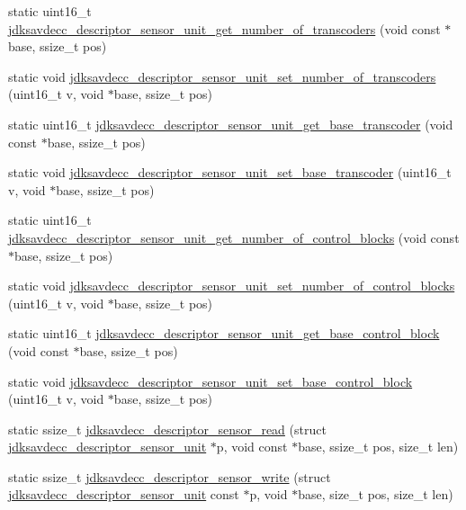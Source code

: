 \begin{DoxyCompactItemize}
\item 
static uint16\+\_\+t \hyperlink{group__descriptor__sensor_gaefa2ca197d1fd3788d54c0ecee03dacd}{jdksavdecc\+\_\+descriptor\+\_\+sensor\+\_\+unit\+\_\+get\+\_\+number\+\_\+of\+\_\+transcoders} (void const $\ast$base, ssize\+\_\+t pos)
\item 
static void \hyperlink{group__descriptor__sensor_gae95fc5d48fb2b22a20cf991b9546a975}{jdksavdecc\+\_\+descriptor\+\_\+sensor\+\_\+unit\+\_\+set\+\_\+number\+\_\+of\+\_\+transcoders} (uint16\+\_\+t v, void $\ast$base, ssize\+\_\+t pos)
\item 
static uint16\+\_\+t \hyperlink{group__descriptor__sensor_ga0453b7a4171ca82f60c1c98015baa634}{jdksavdecc\+\_\+descriptor\+\_\+sensor\+\_\+unit\+\_\+get\+\_\+base\+\_\+transcoder} (void const $\ast$base, ssize\+\_\+t pos)
\item 
static void \hyperlink{group__descriptor__sensor_ga2ffdc6d6d6964e16f6d3f529f51771e8}{jdksavdecc\+\_\+descriptor\+\_\+sensor\+\_\+unit\+\_\+set\+\_\+base\+\_\+transcoder} (uint16\+\_\+t v, void $\ast$base, ssize\+\_\+t pos)
\item 
static uint16\+\_\+t \hyperlink{group__descriptor__sensor_ga95f619830af7cfb75fd5cb65ed4fb26c}{jdksavdecc\+\_\+descriptor\+\_\+sensor\+\_\+unit\+\_\+get\+\_\+number\+\_\+of\+\_\+control\+\_\+blocks} (void const $\ast$base, ssize\+\_\+t pos)
\item 
static void \hyperlink{group__descriptor__sensor_ga51eaf09acad54c56388065f5e3da6417}{jdksavdecc\+\_\+descriptor\+\_\+sensor\+\_\+unit\+\_\+set\+\_\+number\+\_\+of\+\_\+control\+\_\+blocks} (uint16\+\_\+t v, void $\ast$base, ssize\+\_\+t pos)
\item 
static uint16\+\_\+t \hyperlink{group__descriptor__sensor_ga27d66aa606dcaee923ef9400ec6f3221}{jdksavdecc\+\_\+descriptor\+\_\+sensor\+\_\+unit\+\_\+get\+\_\+base\+\_\+control\+\_\+block} (void const $\ast$base, ssize\+\_\+t pos)
\item 
static void \hyperlink{group__descriptor__sensor_gaf6e357e564a8d89324eba56d82886fd1}{jdksavdecc\+\_\+descriptor\+\_\+sensor\+\_\+unit\+\_\+set\+\_\+base\+\_\+control\+\_\+block} (uint16\+\_\+t v, void $\ast$base, ssize\+\_\+t pos)
\item 
static ssize\+\_\+t \hyperlink{group__descriptor__sensor_gaaf9a5dff5959893f12a687e4873d19ef}{jdksavdecc\+\_\+descriptor\+\_\+sensor\+\_\+read} (struct \hyperlink{structjdksavdecc__descriptor__sensor__unit}{jdksavdecc\+\_\+descriptor\+\_\+sensor\+\_\+unit} $\ast$p, void const $\ast$base, ssize\+\_\+t pos, size\+\_\+t len)
\item 
static ssize\+\_\+t \hyperlink{group__descriptor__sensor_ga02377b66b7ac271413654179fa9330ec}{jdksavdecc\+\_\+descriptor\+\_\+sensor\+\_\+write} (struct \hyperlink{structjdksavdecc__descriptor__sensor__unit}{jdksavdecc\+\_\+descriptor\+\_\+sensor\+\_\+unit} const $\ast$p, void $\ast$base, size\+\_\+t pos, size\+\_\+t len)
\end{DoxyCompactItemize}


